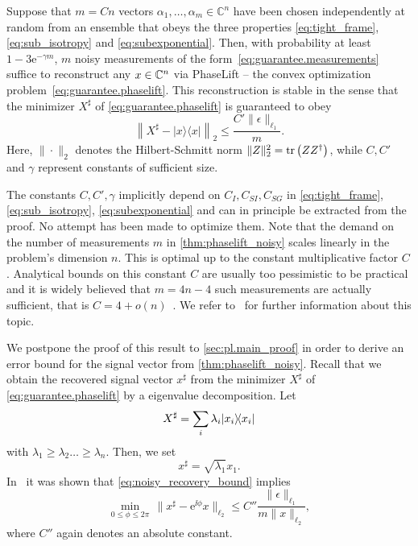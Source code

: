 \begin{theorem}%
  \label{thm:phaselift_noisy}
  Suppose that $m = Cn$ vectors $\alpha_1,\ldots,\alpha_m \in \mathbb{C}^n$ have been chosen independently at random from an ensemble that obeys the three properties \eqref{eq:tight_frame}, \eqref{eq:sub_isotropy} and \eqref{eq:subexponential}.
  Then, with probability at least $1 - 3\mathrm{e}^{-\gamma m}$,  $m$ noisy measurements of the form~\eqref{eq:guarantee.measurements} suffice to reconstruct any ${x} \in {\mathbb{C}}^n$ via PhaseLift -- the convex optimization problem~\eqref{eq:guarantee.phaselift}.
  This reconstruction is stable in the sense that the minimizer ${X}^\sharp$ of \cref{eq:guarantee.phaselift} is guaranteed to obey
  \begin{equation}
    \left\| {X}^\sharp - |{x} \rangle \! \langle {x}| \right\|_2 \leq \frac{C'  \| \epsilon \|_{\ell_1}}{m}. \label{eq:noisy_recovery_bound}
  \end{equation}
Here, $\| \cdot \|_2$ denotes the Hilbert-Schmitt norm $\| {Z} \|_2^2 = \operatorname{tr} \left( {Z} {Z}^\dagger \right)$, while $C,C'$ and $\gamma$ represent constants of sufficient size.
\end{theorem}

The constants $C,C',\gamma$ implicitly depend on $C_I,C_{SI}, C_{SG}$ in \eqref{eq:tight_frame}, \eqref{eq:sub_isotropy}, \eqref{eq:subexponential} and can in principle be extracted from the proof.
No attempt has been made to optimize them.
Note that the demand on the number of measurements $m$ in \cref{thm:phaselift_noisy} scales linearly in the problem's dimension $n$.
This is optimal up to the constant multiplicative factor $C$.
Analytical bounds on this constant $C$ are usually too pessimistic to be practical and it is widely believed that
\(
  m = 4n - 4
\)
such measurements are actually sufficient, that is $C = 4 + o(n)$~\cite{heinosaari_quantum_2013}.
We refer to~\cite{MixonBlog} for further information about this topic.


We postpone the proof of this result to \cref{sec:pl.main_proof} in order to derive an error bound for the signal vector from \cref{thm:phaselift_noisy}.
Recall that we obtain the recovered signal vector ${x}^\sharp$ from the minimizer ${X}^\sharp$ of \cref{eq:guarantee.phaselift} by a eigenvalue decomposition.
Let
\begin{equation}
  {X}^\sharp = \sum_i \lambda_i \ket{ x_i}\bra{ x_i}
\end{equation}
with $\lambda_1 \ge \lambda_2 \ldots \ge \lambda_n$.
Then, we set
\begin{equation}
  {x}^\sharp = \sqrt{\lambda_1}  x_1.
\end{equation}
In~\cite{candes_solving_2012} it was shown that \cref{eq:noisy_recovery_bound} implies
\begin{equation}
  \min_{0 \leq \phi \leq 2 \pi} \, \| {x}^\sharp - \mathrm{e}^{\ii \phi} {x} \|_{\ell_2}
  \leq C'' \frac{\| \epsilon \|_{\ell_1} }{m \| {x} \|_{\ell_2}}
, \label{eq:vectorial_noisy_bound}
\end{equation}
where $C''$ again denotes an absolute constant.

